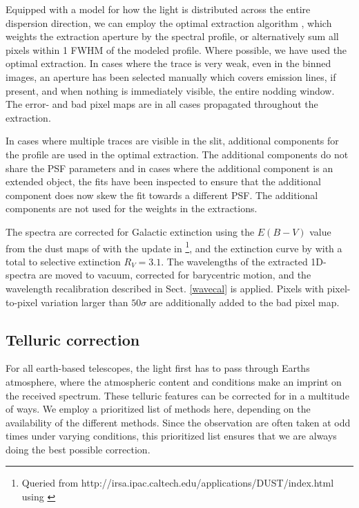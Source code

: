 \documentclass{aa}    %
\begin{document}
Equipped with a model for how the light is distributed across the entire
dispersion direction, we can  employ the optimal extraction algorithm
\citep{Horne1986}, which weights the extraction aperture by the spectral profile,
or alternatively sum all pixels within 1 FWHM of the modeled profile. Where
possible, we have used the optimal extraction. In cases where the trace is very
weak, even in the binned images, an aperture has been selected manually which
covers emission lines, if present, and when nothing is immediately visible, the
entire nodding window. The error- and bad pixel maps are in all cases propagated
throughout the extraction.

In cases where multiple traces are visible in the slit, additional components
for the profile are used in the optimal extraction. The additional components do
not share the PSF parameters and in cases where the additional component is an
extended object, the fits have been inspected to ensure that the additional
component does now skew the fit towards a different PSF. The additional
components are not used for the weights in the extractions.

The spectra are corrected for Galactic extinction using the $E(B-V)$ value from
the dust maps of \citet{Schlegel1998} with the update in
\citet{Schlafly2011}\footnote{Queried from
	http://irsa.ipac.caltech.edu/applications/DUST/index.html using
	\citet{astroquery}}, and the extinction curve by \cite{Cardelli1989} with a
total to selective extinction $R_V = 3.1$. The wavelengths of the extracted
1D-spectra are moved to vacuum, corrected for barycentric motion, and the
wavelength recalibration described in Sect. \ref{wavecal} is applied. Pixels
with pixel-to-pixel variation larger than $50 \sigma$ are additionally added to
the bad pixel map.


\subsection{Telluric correction} \label{tell_corr}

For all earth-based telescopes, the light first has to pass through Earths
atmosphere, where the atmospheric content and conditions make an imprint on the
received spectrum. These telluric features can be corrected for in a multitude
of ways. We employ a prioritized list of methods here, depending on the
availability of the different methods. Since the observation are often taken at
odd times under varying conditions, this prioritized list ensures that we are
always doing the best possible correction.
\end{document}
